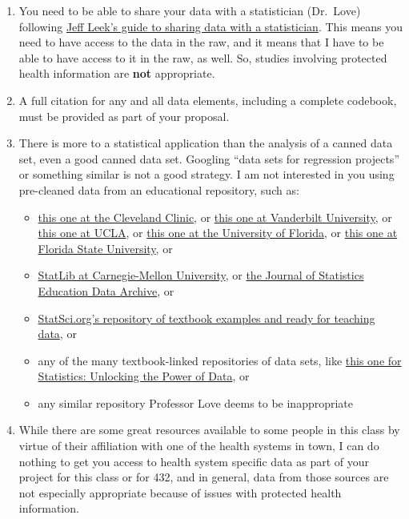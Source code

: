 \documentclass[]{book}
\providecommand{\tightlist}{%
  \setlength{\itemsep}{0pt}\setlength{\parskip}{0pt}}
\theoremstyle{definition}
\theoremstyle{definition}
\theoremstyle{definition}
\theoremstyle{remark}
\begin{document}
\begin{enumerate}
\def\labelenumi{\arabic{enumi}.}
\item
  You need to be able to share your data with a statistician (Dr.~Love)
  following \href{https://github.com/jtleek/datasharing}{Jeff Leek's
  guide to sharing data with a statistician}. This means you need to
  have access to the data in the raw, and it means that I have to be
  able to have access to it in the raw, as well. So, studies involving
  protected health information are \textbf{not} appropriate.
\item
  A full citation for any and all data elements, including a complete
  codebook, must be provided as part of your proposal.
\item
  There is more to a statistical application than the analysis of a
  canned data set, even a good canned data set. Googling ``data sets for
  regression projects'' or something similar is not a good strategy. I
  am not interested in you using pre-cleaned data from an educational
  repository, such as:

  \begin{itemize}
  \tightlist
  \item
    \href{http://www.lerner.ccf.org/qhs/datasets/}{this one at the
    Cleveland Clinic}, or
    \href{http://biostat.mc.vanderbilt.edu/wiki/Main/DataSets}{this one
    at Vanderbilt University}, or
    \href{http://www.stat.ucla.edu/projects/datasets/}{this one at
    UCLA}, or \href{http://www.stat.ufl.edu/~winner/datasets.html}{this
    one at the University of Florida}, or
    \href{http://people.sc.fsu.edu/~jburkardt/datasets/datasets.html}{this
    one at Florida State University}, or
  \item
    \href{http://lib.stat.cmu.edu/datasets/}{StatLib at Carnegie-Mellon
    University}, or
    \href{http://www.amstat.org/publications/jse/jse_data_archive.htm}{the
    Journal of Statistics Education Data Archive}, or
  \item
    \href{http://www.statsci.org/datasets.html}{StatSci.org's repository
    of textbook examples and ready for teaching data}, or
  \item
    any of the many textbook-linked repositories of data sets, like
    \href{http://www.lock5stat.com/datapage.html}{this one for
    Statistics: Unlocking the Power of Data}, or
  \item
    any similar repository Professor Love deems to be inappropriate
  \end{itemize}
\item
  While there are some great resources available to some people in this
  class by virtue of their affiliation with one of the health systems in
  town, I can do nothing to get you access to health system specific
  data as part of your project for this class or for 432, and in
  general, data from those sources are not especially appropriate
  because of issues with protected health information.
\end{enumerate}
\end{document}
